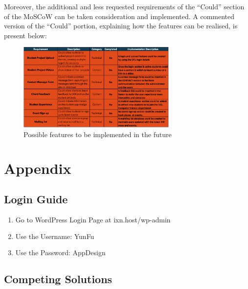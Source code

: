 \documentclass[fontsize=10pt]{extarticle}
\numberwithin{figure}{section} %
\providecommand{\tightlist}{%
  \setlength{\itemsep}{0pt}\setlength{\parskip}{0pt}}
\begin{document}
Moreover, the additional and less requested requirements of the
``Could'' section of the MoSCoW can be taken consideration and
implemented. A commented version of the ``Could'' portion, explaining
how the features can be realised, is present below:

\begin{figure}[H]
      \centering
      \includegraphics[trim = 0 0 0 0, clip, width=0.7\textwidth]{ph6.png}
      \caption{Possible features to be implemented in the future}
 \end{figure}

\hypertarget{appendix}{%
\section{Appendix}\label{appendix}}

\hypertarget{login-guide}{%
\subsection{Login Guide}\label{login-guide}}

\begin{enumerate}

\tightlist
\item
  Go to WordPress Login Page at ixn.host/wp-admin
\item
  Use the Username: YunFu
\item
  Use the Password: AppDesign
\end{enumerate}

\hypertarget{competing-solutions}{%
\subsection{Competing Solutions}\label{competing-solutions}}
\end{document}
